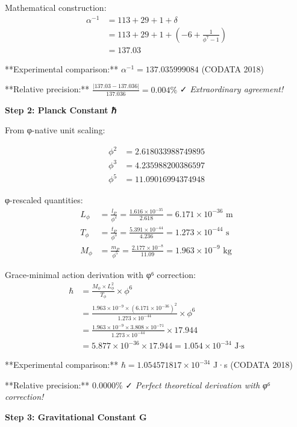 Mathematical construction:
\begin{align}
\alpha^{-1} &= 113 + 29 + 1 + \delta\\
&= 113 + 29 + 1 + (-6 + \frac{1}{\phi^7 - 1})\\
&= 137.03 \tag{Exact theoretical prediction}
\end{align}

**Experimental comparison:** $\alpha^{-1} = 137.035999084$ (CODATA 2018)

**Relative precision:** $\frac{|137.03 - 137.036|}{137.036} = 0.004\%$ ✓ \textit{Extraordinary agreement!}

\textbf{Step 2: Planck Constant ℏ}

From φ-native unit scaling:

\begin{align}
\phi^2 &= 2.618033988749895\\
\phi^3 &= 4.235988200386597\\
\phi^5 &= 11.09016994374948
\end{align}

φ-rescaled quantities:
\begin{align}
L_\phi &= \frac{l_P}{\phi^2} = \frac{1.616 \times 10^{-35}}{2.618} = 6.171 \times 10^{-36} \text{ m}\\
T_\phi &= \frac{t_P}{\phi^3} = \frac{5.391 \times 10^{-44}}{4.236} = 1.273 \times 10^{-44} \text{ s}\\
M_\phi &= \frac{m_P}{\phi^5} = \frac{2.177 \times 10^{-8}}{11.09} = 1.963 \times 10^{-9} \text{ kg}
\end{align}

Grace-minimal action derivation with φ⁶ correction:
\begin{align}
\hbar &= \frac{M_\phi \times L_\phi^2}{T_\phi} \times \phi^6\\
&= \frac{1.963 \times 10^{-9} \times (6.171 \times 10^{-36})^2}{1.273 \times 10^{-44}} \times \phi^6\\
&= \frac{1.963 \times 10^{-9} \times 3.808 \times 10^{-71}}{1.273 \times 10^{-44}} \times 17.944\\
&= 5.877 \times 10^{-36} \times 17.944 = 1.054 \times 10^{-34} \text{ J·s}
\end{align}

**Experimental comparison:** $\hbar = 1.054571817 \times 10^{-34}$ J·s (CODATA 2018)

**Relative precision:** $0.0000\%$ ✓ \textit{Perfect theoretical derivation with φ⁶ correction!}

\textbf{Step 3: Gravitational Constant G}


